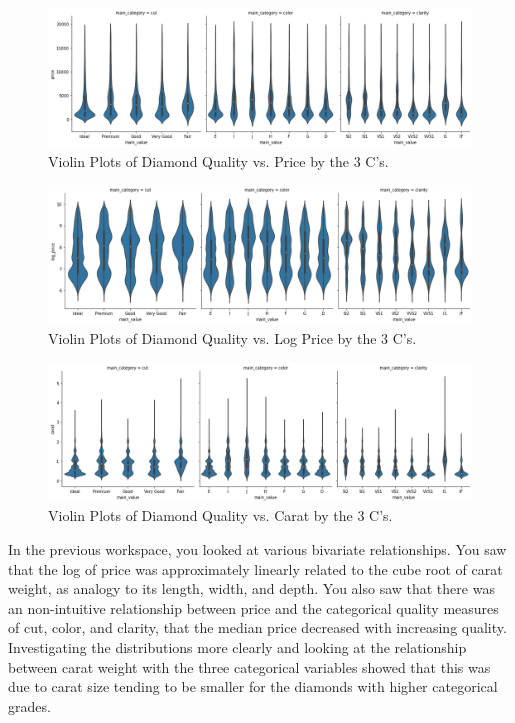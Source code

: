 \begin{figure}
	\includegraphics[width=\textwidth,height=\textheight,keepaspectratio]{images/figure55.png}
	\caption{Violin Plots of Diamond Quality vs. Price by the 3 C's.}\label{fig:figure55}
\end{figure}

\begin{figure}
	\includegraphics[width=\textwidth,height=\textheight,keepaspectratio]{images/figure56.png}
	\caption{Violin Plots of Diamond Quality vs. Log Price by the 3 C's.}\label{fig:figure56}
\end{figure}

\begin{figure}
	\includegraphics[width=\textwidth,height=\textheight,keepaspectratio]{images/figure57.png}
	\caption{Violin Plots of Diamond Quality vs. Carat by the 3 C's.}\label{fig:figure57}
\end{figure}

\newpage
In the previous workspace, you looked at various bivariate relationships. You saw that the log of price was approximately linearly related to the cube root of carat weight, as analogy to its length, width, and depth. You also saw that there was an non-intuitive relationship between price and the categorical quality measures of cut, color, and clarity, that the median price decreased with increasing quality. Investigating the distributions more clearly and looking at the relationship between carat weight with the three categorical variables showed that this was due to carat size tending to be smaller for the diamonds with higher categorical grades.
\\\\

